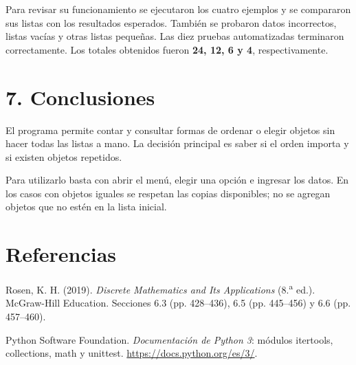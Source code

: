 \documentclass[11pt,a4paper]{article}
\begin{document}
Para revisar su funcionamiento se ejecutaron los cuatro ejemplos y se
compararon sus listas con los resultados esperados. También se probaron
datos incorrectos, listas vacías y otras listas pequeñas. Las diez pruebas
automatizadas terminaron correctamente. Los totales obtenidos fueron
\textbf{24, 12, 6 y 4}, respectivamente.

\section*{7. Conclusiones}
El programa permite contar y consultar formas de ordenar o elegir objetos
sin hacer todas las listas a mano. La decisión principal es saber si el
orden importa y si existen objetos repetidos.

Para utilizarlo basta con abrir el menú, elegir una opción e ingresar los
datos. En los casos con objetos iguales se respetan las copias disponibles;
no se agregan objetos que no estén en la lista inicial.

\section*{Referencias}
Rosen, K. H. (2019). \textit{Discrete Mathematics and Its Applications}
(8.\textsuperscript{a} ed.). McGraw-Hill Education. Secciones 6.3 (pp. 428--436), 6.5 (pp. 445--456) y 6.6 (pp. 457--460).

Python Software Foundation. \textit{Documentación de Python 3}: módulos itertools, collections, math y unittest.
\url{https://docs.python.org/es/3/}.
\end{document}
